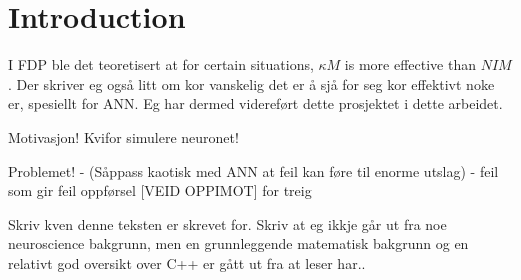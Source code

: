 

\section{Introduction}



I FDP ble det teoretisert at 
	for certain situations, $\kappa M$ is more effective than $NIM$.
Der skriver eg også litt om kor  vanskelig det er å sjå for seg kor effektivt noke er, spesiellt for ANN.
Eg har dermed videreført dette prosjektet i dette arbeidet.







Motivasjon! Kvifor simulere neuronet!

Problemet!  - (Såppass kaotisk med ANN at feil kan føre til enorme utslag)
			- feil som gir feil oppførsel [VEID OPPIMOT]  for treig


Skriv kven denne teksten er skrevet for. Skriv at eg ikkje går ut fra noe neuroscience bakgrunn, men en grunnleggende matematisk bakgrunn og en relativt god oversikt over C++ er gått ut fra at leser har..


